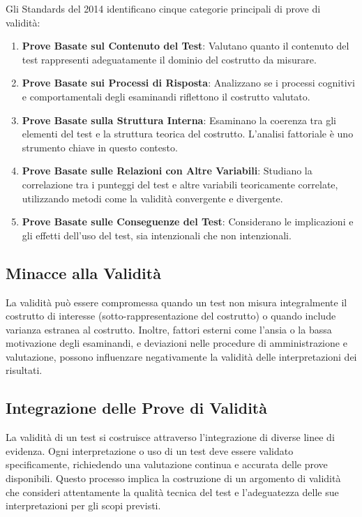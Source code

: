 \documentclass[
  letterpaper,
  DIV=11,
  numbers=noendperiod]{scrreprt}
\providecommand{\tightlist}{%
  \setlength{\itemsep}{0pt}\setlength{\parskip}{0pt}}\usepackage{longtable,booktabs,array}
\theoremstyle{definition}
\theoremstyle{remark}
\begin{document}
Gli Standards del 2014 identificano cinque categorie principali di prove
di validità:

\begin{enumerate}
\def\labelenumi{\arabic{enumi}.}
\tightlist
\item
  \textbf{Prove Basate sul Contenuto del Test}: Valutano quanto il
  contenuto del test rappresenti adeguatamente il dominio del costrutto
  da misurare.
\item
  \textbf{Prove Basate sui Processi di Risposta}: Analizzano se i
  processi cognitivi e comportamentali degli esaminandi riflettono il
  costrutto valutato.
\item
  \textbf{Prove Basate sulla Struttura Interna}: Esaminano la coerenza
  tra gli elementi del test e la struttura teorica del costrutto.
  L'analisi fattoriale è uno strumento chiave in questo contesto.
\item
  \textbf{Prove Basate sulle Relazioni con Altre Variabili}: Studiano la
  correlazione tra i punteggi del test e altre variabili teoricamente
  correlate, utilizzando metodi come la validità convergente e
  divergente.
\item
  \textbf{Prove Basate sulle Conseguenze del Test}: Considerano le
  implicazioni e gli effetti dell'uso del test, sia intenzionali che non
  intenzionali.
\end{enumerate}

\subsection{Minacce alla Validità}\label{minacce-alla-validituxe0}

La validità può essere compromessa quando un test non misura
integralmente il costrutto di interesse (sotto-rappresentazione del
costrutto) o quando include varianza estranea al costrutto. Inoltre,
fattori esterni come l'ansia o la bassa motivazione degli esaminandi, e
deviazioni nelle procedure di amministrazione e valutazione, possono
influenzare negativamente la validità delle interpretazioni dei
risultati.

\subsection{Integrazione delle Prove di
Validità}\label{integrazione-delle-prove-di-validituxe0}

La validità di un test si costruisce attraverso l'integrazione di
diverse linee di evidenza. Ogni interpretazione o uso di un test deve
essere validato specificamente, richiedendo una valutazione continua e
accurata delle prove disponibili. Questo processo implica la costruzione
di un argomento di validità che consideri attentamente la qualità
tecnica del test e l'adeguatezza delle sue interpretazioni per gli scopi
previsti.
\end{document}
